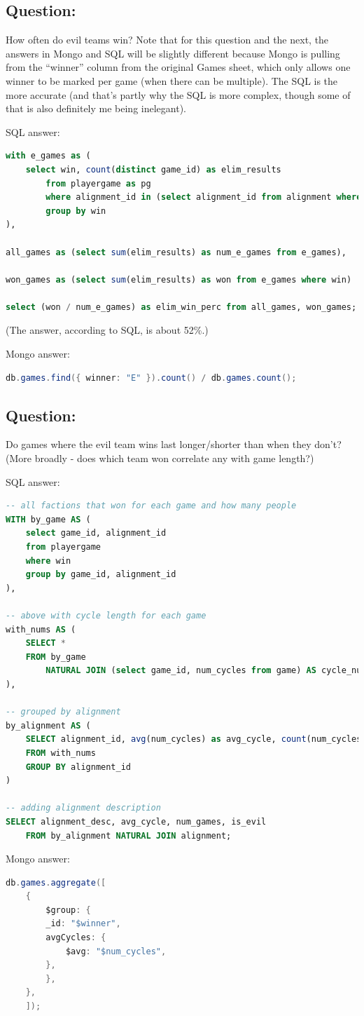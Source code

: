 \documentclass[11pt, oneside]{amsart}   	%
\begin{document}
\subsection{Question:} How often do evil teams win? 
Note that for this question and the next, the answers in Mongo and SQL will be slightly different because Mongo is pulling from the ``winner'' column from the original Games sheet, which only allows one winner to be marked per game (when there can be multiple). The SQL is the more accurate (and that's partly why the SQL is more complex, though some of that is also definitely me being inelegant). 

SQL answer:
\begin{lstlisting}[language=SQL]
with e_games as (
    select win, count(distinct game_id) as elim_results
        from playergame as pg
        where alignment_id in (select alignment_id from alignment where is_elim)
        group by win
),

all_games as (select sum(elim_results) as num_e_games from e_games),

won_games as (select sum(elim_results) as won from e_games where win)

select (won / num_e_games) as elim_win_perc from all_games, won_games;
\end{lstlisting}
(The answer, according to SQL, is about 52\%.)

Mongo answer:
\begin{lstlisting}[language=java]
db.games.find({ winner: "E" }).count() / db.games.count();
\end{lstlisting}

\subsection{Question:} Do games where the evil team wins last longer/shorter than when they don't? (More broadly - does which team won correlate any with game length?)

SQL answer:
\begin{lstlisting}[language=SQL]
-- all factions that won for each game and how many people 
WITH by_game AS (
    select game_id, alignment_id
    from playergame
    where win
    group by game_id, alignment_id
),

-- above with cycle length for each game
with_nums AS (
    SELECT * 
    FROM by_game 
        NATURAL JOIN (select game_id, num_cycles from game) AS cycle_nums
), 

-- grouped by alignment
by_alignment AS (
    SELECT alignment_id, avg(num_cycles) as avg_cycle, count(num_cycles) as num_games
    FROM with_nums 
    GROUP BY alignment_id
)

-- adding alignment description
SELECT alignment_desc, avg_cycle, num_games, is_evil 
    FROM by_alignment NATURAL JOIN alignment;
\end{lstlisting}


Mongo answer:
\begin{lstlisting}[language=java]
db.games.aggregate([
    {
        $group: {
        _id: "$winner",
        avgCycles: {
            $avg: "$num_cycles",
        },
        },
    },
    ]);
\end{lstlisting}
\end{document}
